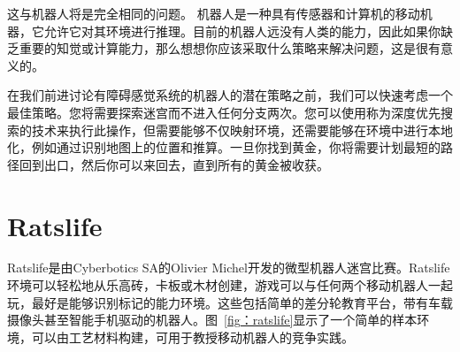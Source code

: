这与机器人将是完全相同的问题。 机器人是一种具有传感器和计算机的移动机器，它允许它对其环境进行推理。目前的机器人远没有人类的能力，因此如果你缺乏重要的知觉或计算能力，那么想想你应该采取什么策略来解决问题，这是很有意义的。


在我们前进讨论有障碍感觉系统的机器人的潜在策略之前，我们可以快速考虑一个最佳策略。您将需要探索迷宫而不进入任何分支两次。您可以使用称为深度优先搜索的技术来执行此操作，但需要能够不仅映射环境，还需要能够在环境中进行本地化，例如通过识别地图上的位置和推算。一旦你找到黄金，你将需要计划最短的路径回到出口，然后你可以来回去，直到所有的黄金被收获。

\section{Ratslife}\label{sec:ratslife}

Ratslife是由Cyberbotics SA的Olivier Michel开发的微型机器人迷宫比赛。Ratslife环境可以轻松地从乐高砖，卡板或木材创建，游戏可以与任何两个移动机器人一起玩，最好是能够识别标记的能力环境。这些包括简单的差分轮教育平台，带有车载摄像头甚至智能手机驱动的机器人。图~\ref{fig：ratslife}显示了一个简单的样本环境，可以由工艺材料构建，可用于教授移动机器人的竞争实践。

